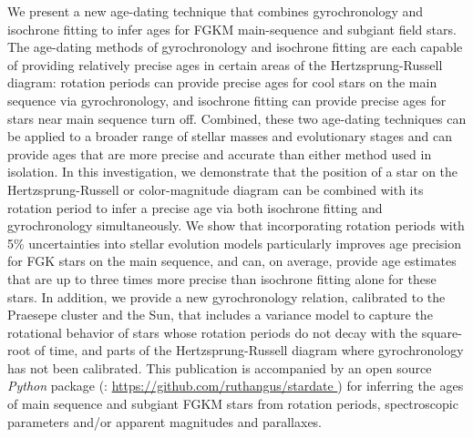 We present a new age-dating technique that combines gyrochronology and
isochrone fitting to infer ages for FGKM main-sequence and subgiant field
stars.
The age-dating methods of gyrochronology and isochrone fitting are each
capable of providing relatively precise ages in certain areas of the
Hertzsprung-Russell diagram: rotation periods can provide precise ages for
cool stars on the main sequence via gyrochronology, and isochrone fitting
can provide precise ages for stars near main sequence turn off.
Combined, these two age-dating techniques can be applied to a broader range of
stellar masses and evolutionary stages and can provide ages that are more
precise and accurate than either method used in isolation.
In this investigation, we demonstrate that the position of a star on the
Hertzsprung-Russell or color-magnitude diagram can be combined with its
rotation period to infer a precise age via both isochrone fitting and
gyrochronology simultaneously.
We show that incorporating rotation periods with 5\% uncertainties into
stellar evolution models particularly improves age precision for FGK stars on
the main sequence, and can, on average, provide age estimates that are up to
three times more precise than isochrone fitting alone for these stars.
In addition, we provide a new gyrochronology relation, calibrated to the
Praesepe cluster and the Sun, that includes a variance model to capture the
rotational behavior of stars whose rotation periods do not decay with the
square-root of time, and parts of the Hertzsprung-Russell diagram where
gyrochronology has not been calibrated.
This publication is accompanied by an open source {\it Python} package (\sd:
\url{ https://github.com/ruthangus/stardate }) for inferring the ages of main
sequence and subgiant FGKM stars from rotation periods, spectroscopic
parameters and/or apparent magnitudes and parallaxes.

